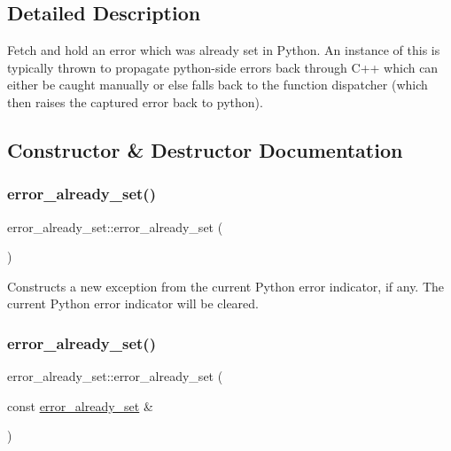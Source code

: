 \subsection{Detailed Description}
Fetch and hold an error which was already set in Python. An instance of this is typically thrown to propagate python-\/side errors back through C++ which can either be caught manually or else falls back to the function dispatcher (which then raises the captured error back to python). 

\subsection{Constructor \& Destructor Documentation}
\mbox{\label{classerror__already__set_a9f6456fb9f03460d943682037132e819}} 
\subsubsection{\texorpdfstring{error\_already\_set()}{error\_already\_set()}\hspace{0.1cm}{\footnotesize\ttfamily [1/3]}}
{\footnotesize\ttfamily error\+\_\+already\+\_\+set\+::error\+\_\+already\+\_\+set (\begin{DoxyParamCaption}{ }\end{DoxyParamCaption})\hspace{0.3cm}{\ttfamily [inline]}}

Constructs a new exception from the current Python error indicator, if any. The current Python error indicator will be cleared. \mbox{\label{classerror__already__set_a8bea74f30b56b414ee2629009cb252f4}} 
\subsubsection{\texorpdfstring{error\_already\_set()}{error\_already\_set()}\hspace{0.1cm}{\footnotesize\ttfamily [2/3]}}
{\footnotesize\ttfamily error\+\_\+already\+\_\+set\+::error\+\_\+already\+\_\+set (\begin{DoxyParamCaption}\item[{const \mbox{\hyperlink{classerror__already__set}{error\+\_\+already\+\_\+set}} \&}]{ }\end{DoxyParamCaption})\hspace{0.3cm}{\ttfamily [default]}}

